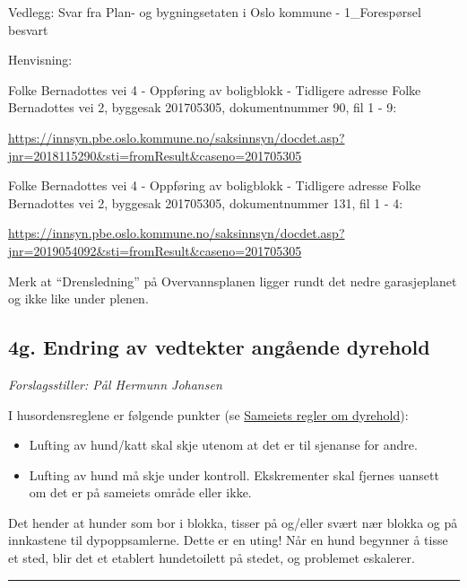 \documentclass[12pt]{article}
\begin{document}
Vedlegg:
Svar fra Plan- og bygningsetaten i Oslo kommune - 1\_Forespørsel besvart

Henvisning:

Folke Bernadottes vei 4 - Oppføring av boligblokk - Tidligere adresse Folke Bernadottes vei 2,
byggesak 201705305, dokumentnummer 90, fil 1 - 9:

\href{https://innsyn.pbe.oslo.kommune.no/saksinnsyn/docdet.asp?jnr=2018115290\&sti=fromResult\&caseno=201705305}{https://innsyn.pbe.oslo.kommune.no/saksinnsyn/docdet.asp?\\jnr=2018115290\&sti=fromResult\&caseno=201705305}

Folke Bernadottes vei 4 - Oppføring av boligblokk - Tidligere adresse Folke Bernadottes vei 2,
byggesak 201705305, dokumentnummer 131, fil 1 - 4:

\href{https://innsyn.pbe.oslo.kommune.no/saksinnsyn/docdet.asp?jnr=2019054092\&sti=fromResult\&caseno=201705305}{https://innsyn.pbe.oslo.kommune.no/saksinnsyn/docdet.asp?\\jnr=2019054092\&sti=fromResult\&caseno=201705305}

Merk at ``Drensledning'' på Overvannsplanen ligger rundt det nedre garasjeplanet og ikke like under plenen.

\subsection*{4g. Endring av vedtekter angående dyrehold}

{\em Forslagsstiller: Pål Hermunn Johansen}

I husordensreglene er følgende punkter (se \href{http://fb2.no/nyttig/dyrehold/}{Sameiets regler om dyrehold}):

\begin{itemize}
\item Lufting av hund/katt skal skje utenom at det er til sjenanse for andre.
\item Lufting av hund må skje under kontroll. Ekskrementer skal fjernes uansett om det er på sameiets område eller ikke.
\end{itemize}

Det hender at hunder som bor i blokka, tisser på og/eller svært nær blokka og på innkastene til dypoppsamlerne. Dette er en uting! Når en hund begynner å tisse et sted, blir det et etablert hundetoilett på stedet, og problemet eskalerer.

{\rule{\textwidth}{0.3pt}}
\end{document}
